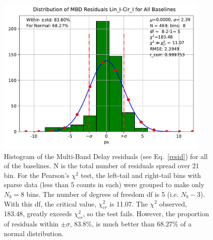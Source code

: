 \documentclass[letterpaper,twoside,12pt]{article}
\begin{document}
\begin{figure}[ht!]
  \begin{center}
  \includegraphics[width=25pc]{Distr_MBD_Lin_I-Cir_I_Diff.pdf}
  \caption{\small Histogram of the Multi-Band Delay residuals (see Eq.~\eqref{resid}) for all of the baselines. N is the total number of residuals spread over 21 bin. For the Pearson's $\chi^2$ test, the left-tail and right-tail bins with sparse data (less than 5 counts in each) were grouped to make only $N_b=8$ bins. The number of degrees of freedom df is 5 (i.e. $N_b-3$). With this df, the critical value, $\chi^2_{cr}$ is 11.07. The $\chi^2$ observed, 183.48, greatly exceeds $\chi^2_{cr}$, so the test fails. However, the proportion of residuals within $\pm\sigma$, 83.8\%, is much better than 68.27\% of a normal distribution.}
  \label{dmbd_distr}
  \end{center}
\end{figure}
\end{document}
